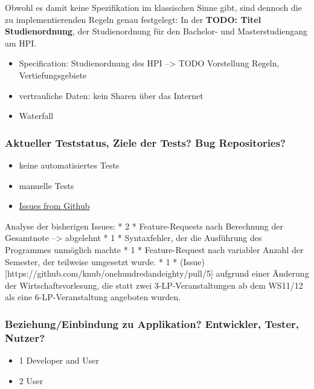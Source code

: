 \documentclass[]{article}
\begin{document}
Obwohl es damit keine Spezifikation im klassischen Sinne gibt, sind
dennoch die zu implementierenden Regeln genau festgelegt: In der
\textbf{TODO: Titel Studienordnung}, der Studienordnung für den
Bachelor- und Masterstudiengang am HPI.

\begin{itemize}
\itemsep1pt\parskip0pt
\item
  Specification: Studienordnung des HPI --\textgreater{} TODO
  Vorstellung Regeln, Vertiefungsgebiete
\item
  vertrauliche Daten: kein Sharen über das Internet
\item
  Waterfall
\end{itemize}

\subsubsection{Aktueller Teststatus, Ziele der Tests? Bug
Repositories?}\label{aktueller-teststatus-ziele-der-tests-bug-repositories}

\begin{itemize}
\itemsep1pt\parskip0pt
\item
  keine automatisiertes Tests
\item
  manuelle Tests
\item
  \href{https://github.com/knub/onehundredandeighty/issues?utf8=\%E2\%9C\%93\&q=is\%3Aissue}{Issues
  from Github}
\end{itemize}

Analyse der bisherigen Issues: * 2 * Feature-Requests nach Berechnung
der Gesamtnote --\textgreater{} abgelehnt * 1 * Syntaxfehler, der die
Ausführung des Programmes unmöglich machte * 1 * Feature-Request nach
variabler Anzahl der Semester, der teilweise umgesetzt wurde. * 1 *
(Issue){[}https://github.com/knub/onehundredandeighty/pull/5{]} aufgrund
einer Änderung der Wirtschaftsvorlesung, die statt zwei
3-LP-Veranstaltungen ab dem WS11/12 als eine 6-LP-Veranstaltung
angeboten wurden.

\subsubsection{Beziehung/Einbindung zu Applikation? Entwickler, Tester,
Nutzer?}\label{beziehungeinbindung-zu-applikation-entwickler-tester-nutzer}

\begin{itemize}
\itemsep1pt\parskip0pt
\item
  1 Developer and User
\item
  2 User
\end{itemize}
\end{document}
